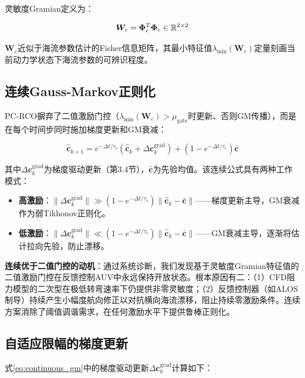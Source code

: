 灵敏度Gramian定义为：

\begin{equation}
    \bm{W}_c = \bm{\Phi}_c^T\bm{\Phi}_c \in \mathbb{R}^{2\times 2}
    \label{eq:gramian}
\end{equation}

$\bm{W}_c$近似于海流参数估计的Fisher信息矩阵，其最小特征值$\lambda_{\min}(\bm{W}_c)$定量刻画当前动力学状态下海流参数的可辨识程度。

\subsection{连续Gauss-Markov正则化}

PC-RCO摒弃了二值激励门控（$\lambda_{\min}(\bm{W}_c) > \mu_{\text{gate}}$时更新、否则GM传播），而是在每个时间步同时施加梯度更新和GM衰减：

\begin{equation}
    \hat{\bm{c}}_{k+1} = e^{-\Delta t/\tau_c}\left(\hat{\bm{c}}_k + \Delta\bm{c}_k^{\text{grad}}\right) + (1-e^{-\Delta t/\tau_c})\bar{\bm{c}}
    \label{eq:continuous_gm}
\end{equation}

其中$\Delta\bm{c}_k^{\text{grad}}$为梯度驱动更新（第3.4节），$\bar{\bm{c}}$为先验均值。该连续公式具有两种工作模式：
\begin{itemize}[itemsep=0pt,topsep=4pt]
    \item \textbf{高激励}：$\|\Delta\bm{c}_k^{\text{grad}}\| \gg (1-e^{-\Delta t/\tau_c})\|\hat{\bm{c}}_k - \bar{\bm{c}}\|$——梯度更新主导，GM衰减作为弱Tikhonov正则化。
    \item \textbf{低激励}：$\|\Delta\bm{c}_k^{\text{grad}}\| \ll (1-e^{-\Delta t/\tau_c})\|\hat{\bm{c}}_k - \bar{\bm{c}}\|$——GM衰减主导，逐渐将估计拉向先验，防止漂移。
\end{itemize}

\textbf{连续优于二值门控的动机}：通过系统诊断，我们发现基于灵敏度Gramian特征值的二值激励门控在反馈控制AUV中永远保持开放状态。根本原因有二：（1）CFD阻力模型的二次型在极低转弯速率下仍提供非零灵敏度；（2）反馈控制器（如ALOS制导）持续产生小幅度航向修正以对抗横向海流漂移，阻止持续零激励条件。连续方案消除了阈值调谐需求，在任何激励水平下提供鲁棒正则化。

\subsection{自适应限幅的梯度更新}

式\eqref{eq:continuous_gm}中的梯度驱动更新$\Delta\bm{c}_k^{\text{grad}}$计算如下：

